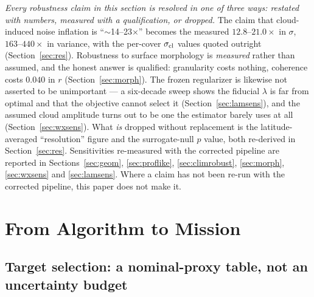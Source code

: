 \documentclass[twocolumn,10pt]{article}
\begin{document}
\emph{Every robustness claim in this section is resolved in one of three ways:
restated with numbers, measured with a qualification, or dropped.}
The claim that cloud-induced noise inflation is
``$\sim$14--23$\times$'' becomes the measured $12.8$--$21.0\times$ in $\sigma$,
$163$--$440\times$ in variance, with the per-cover $\sigma_{\rm cl}$ values
quoted outright (Section~\ref{sec:res}). Robustness to surface morphology is \emph{measured} rather than assumed, and
the honest answer is qualified: granularity costs nothing, coherence costs
$0.040$ in $r$ (Section~\ref{sec:morph}). The frozen regularizer is likewise
not asserted to be unimportant --- a six-decade sweep shows the fiducial
$\lambda$ is far from optimal and that the objective cannot select it
(Section~\ref{sec:lamsens}), and the assumed cloud amplitude turns out to be one
the estimator barely uses at all (Section~\ref{sec:wxsens}). What \emph{is}
dropped without replacement is the latitude-averaged ``resolution'' figure
and the surrogate-null $p$ value, both re-derived in Section~\ref{sec:res}.
Sensitivities re-measured with the corrected pipeline are reported in
Sections~\ref{sec:geom}, \ref{sec:proflike}, \ref{sec:climrobust},
\ref{sec:morph}, \ref{sec:wxsens} and \ref{sec:lamsens}. Where a claim has not
been re-run with the corrected pipeline, this paper does not make it.

\section{From Algorithm to Mission}
\label{sec:mission}

\subsection{Target selection: a nominal-proxy table, not an uncertainty budget}
\label{sec:targets}
\end{document}
